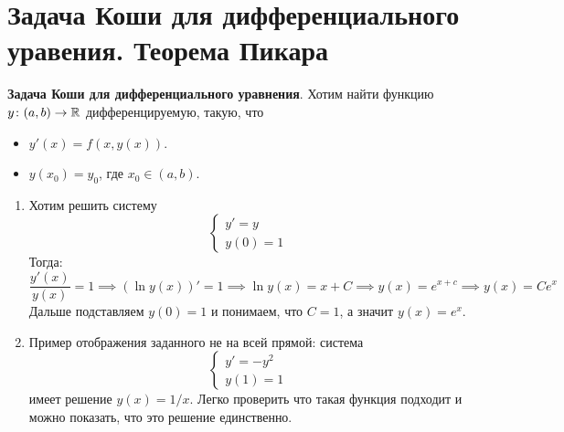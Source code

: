 \section{Задача Коши для дифференциального уравения. Теорема Пикара}
\begin{conj}
\textbf{Задача Коши для дифференциального уравнения}. Хотим найти функцию $y\colon (a, b) \to \mathbb{R}$ дифференцируемую, такую, что
\begin{itemize}
    \item $y'(x) = f(x, y(x))$.
    \item $y(x_0) = y_0$, где $x_0 \in (a, b)$.
\end{itemize}
\end{conj}

\begin{examples}
\begin{enumerate}
    \item
    Хотим решить систему
    \begin{equation*}
    \begin{cases}
        y' = y \\
        y(0) = 1
    \end{cases}
    \end{equation*}
    Тогда:
    \begin{equation*}
    \frac{y'(x)}{y(x)} = 1 \implies (\ln y(x))' = 1 \implies \ln y(x) = x + C \implies y(x) = e^{x + c} \implies y(x) = Ce^x
    \end{equation*}
    Дальше подставляем $y(0) = 1$ и понимаем, что $C = 1$, а значит $y(x) = e^x$.

    \item
    Пример отображения заданного не на всей прямой: система
    \begin{equation*}
    \begin{cases}
        y' = -y^2 \\
        y(1) = 1
    \end{cases}
    \end{equation*}
    имеет решение $y(x) = 1/x$. Легко проверить что такая функция подходит и можно показать, что это решение единственно.
\end{enumerate}
\end{examples}

